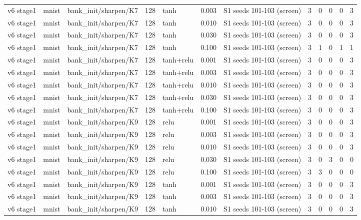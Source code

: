 \begin{table}[htbp]
{\begin{tabular}{@{}lllrlrlrrrrr@{}}
v6 stage1 & mnist & bank\_init/sharpen/K7 & 128 & tanh & 0.003 & S1 seeds 101-103 (screen) & 3 & 0 & 0 & 0 & 3 \\
v6 stage1 & mnist & bank\_init/sharpen/K7 & 128 & tanh & 0.010 & S1 seeds 101-103 (screen) & 3 & 0 & 0 & 0 & 3 \\
v6 stage1 & mnist & bank\_init/sharpen/K7 & 128 & tanh & 0.030 & S1 seeds 101-103 (screen) & 3 & 0 & 0 & 0 & 3 \\
v6 stage1 & mnist & bank\_init/sharpen/K7 & 128 & tanh & 0.100 & S1 seeds 101-103 (screen) & 3 & 1 & 0 & 1 & 1 \\
v6 stage1 & mnist & bank\_init/sharpen/K7 & 128 & tanh+relu & 0.001 & S1 seeds 101-103 (screen) & 3 & 0 & 0 & 0 & 3 \\
v6 stage1 & mnist & bank\_init/sharpen/K7 & 128 & tanh+relu & 0.003 & S1 seeds 101-103 (screen) & 3 & 0 & 0 & 0 & 3 \\
v6 stage1 & mnist & bank\_init/sharpen/K7 & 128 & tanh+relu & 0.010 & S1 seeds 101-103 (screen) & 3 & 0 & 0 & 0 & 3 \\
v6 stage1 & mnist & bank\_init/sharpen/K7 & 128 & tanh+relu & 0.030 & S1 seeds 101-103 (screen) & 3 & 0 & 0 & 0 & 3 \\
v6 stage1 & mnist & bank\_init/sharpen/K7 & 128 & tanh+relu & 0.100 & S1 seeds 101-103 (screen) & 3 & 0 & 0 & 0 & 3 \\
v6 stage1 & mnist & bank\_init/sharpen/K9 & 128 & relu & 0.001 & S1 seeds 101-103 (screen) & 3 & 0 & 0 & 0 & 3 \\
v6 stage1 & mnist & bank\_init/sharpen/K9 & 128 & relu & 0.003 & S1 seeds 101-103 (screen) & 3 & 0 & 0 & 0 & 3 \\
v6 stage1 & mnist & bank\_init/sharpen/K9 & 128 & relu & 0.010 & S1 seeds 101-103 (screen) & 3 & 0 & 0 & 0 & 3 \\
v6 stage1 & mnist & bank\_init/sharpen/K9 & 128 & relu & 0.030 & S1 seeds 101-103 (screen) & 3 & 0 & 3 & 0 & 0 \\
v6 stage1 & mnist & bank\_init/sharpen/K9 & 128 & relu & 0.100 & S1 seeds 101-103 (screen) & 3 & 3 & 0 & 0 & 0 \\
v6 stage1 & mnist & bank\_init/sharpen/K9 & 128 & tanh & 0.001 & S1 seeds 101-103 (screen) & 3 & 0 & 0 & 0 & 3 \\
v6 stage1 & mnist & bank\_init/sharpen/K9 & 128 & tanh & 0.003 & S1 seeds 101-103 (screen) & 3 & 0 & 0 & 0 & 3 \\
v6 stage1 & mnist & bank\_init/sharpen/K9 & 128 & tanh & 0.010 & S1 seeds 101-103 (screen) & 3 & 0 & 0 & 0 & 3 \\

\end{tabular}}
\end{table}
